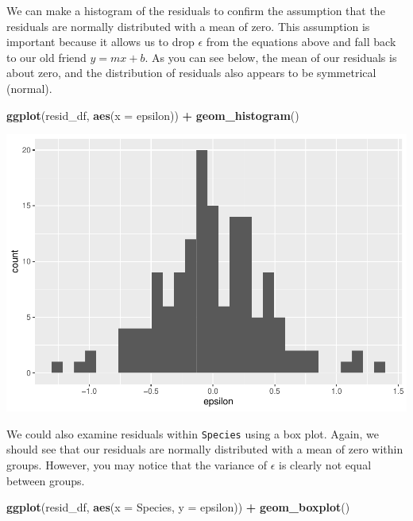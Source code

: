 \documentclass[
]{book}
\newenvironment{Shaded}{\begin{snugshade}}{\end{snugshade}}
\newcommand{\DataTypeTok}[1]{\textcolor[rgb]{0.13,0.29,0.53}{#1}}
\newcommand{\KeywordTok}[1]{\textcolor[rgb]{0.13,0.29,0.53}{\textbf{#1}}}
\newcommand{\NormalTok}[1]{#1}
\newcommand{\OperatorTok}[1]{\textcolor[rgb]{0.81,0.36,0.00}{\textbf{#1}}}
\newcommand{\StringTok}[1]{\textcolor[rgb]{0.31,0.60,0.02}{#1}}
\begin{document}
We can make a histogram of the residuals to confirm the assumption that the residuals are normally distributed with a mean of zero. This assumption is important because it allows us to drop \(\epsilon\) from the equations above and fall back to our old friend \(y = mx + b\). As you can see below, the mean of our residuals is about zero, and the distribution of residuals also appears to be symmetrical (normal).

\begin{Shaded}
\begin{Highlighting}[]
\KeywordTok{ggplot}\NormalTok{(resid_df, }\KeywordTok{aes}\NormalTok{(}\DataTypeTok{x =}\NormalTok{ epsilon)) }\OperatorTok{+}
\StringTok{  }\KeywordTok{geom_histogram}\NormalTok{()}
\end{Highlighting}
\end{Shaded}

\includegraphics{worstr_files/figure-latex/unnamed-chunk-218-1.pdf}

We could also examine residuals within \texttt{Species} using a box plot. Again, we should see that our residuals are normally distributed with a mean of zero within groups. However, you may notice that the variance of \(\epsilon\) is clearly not equal between groups.

\begin{Shaded}
\begin{Highlighting}[]
\KeywordTok{ggplot}\NormalTok{(resid_df, }\KeywordTok{aes}\NormalTok{(}\DataTypeTok{x =}\NormalTok{ Species, }\DataTypeTok{y =}\NormalTok{ epsilon)) }\OperatorTok{+}
\StringTok{  }\KeywordTok{geom_boxplot}\NormalTok{()}
\end{Highlighting}
\end{Shaded}
\end{document}
